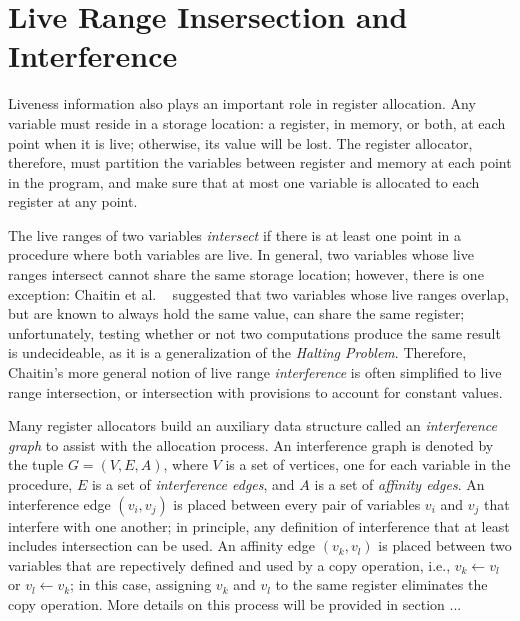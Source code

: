 \section{Live Range Insersection and Interference}

Liveness information also plays an important role in
register allocation. Any variable must reside in a 
storage location: a register, in memory, or both, at each
point when it is live; otherwise, its value will be lost.
The register allocator, therefore, must partition the
variables between register and memory at each point in
the program, and make sure that at most one variable is
allocated to each register at any point. 

The live ranges of two variables \emph{intersect} if
there is at least one point in a procedure where both
variables are live. In general, two variables whose live
ranges intersect cannot share the same storage location;
however, there is one exception: Chaitin et al.
~\cite{Chaitin81,ChaitinJun82} suggested that two variables
whose live ranges overlap, but are known to always hold
the same value, can share the same register; unfortunately,
testing whether or not two computations produce the same
result is undecideable, as it is a generalization of
the \emph{Halting Problem}. Therefore, Chaitin's more
general notion of live range \emph{interference} is often 
simplified to live range intersection, or intersection
with provisions to account for constant values. 

Many register allocators build an auxiliary data structure
called an \emph{interference graph} to assist with the
allocation process. An interference graph is denoted by
the tuple $G = (V, E, A)$, where $V$ is a set of vertices,
one for each variable in the procedure, $E$ is a set of
\emph{interference edges}, and $A$ is a set of 
\emph{affinity edges}. An interference edge $(v_{i}, v_{j})$
is placed between every pair of variables $v_{i}$ and 
$v_{j}$ that interfere with one another; in principle,
any definition of interference that at least includes
intersection can be used. An affinity edge $(v_{k}, v_{l})$
is placed between two variables that are repectively 
defined and used by a copy operation, i.e., 
$v_{k} \leftarrow v_{l}$ or $v_{l} \leftarrow v_{k}$;
in this case, assigning $v_{k}$ and $v_{l}$ to the
same register eliminates the copy operation. More details
on this process will be provided in section ...

